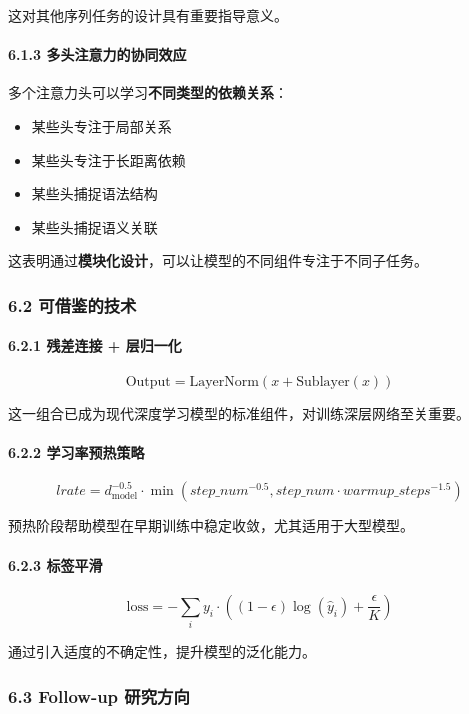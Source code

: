 \documentclass[11pt,a4paper]{article}
\begin{document}
这对其他序列任务的设计具有重要指导意义。

\paragraph{6.1.3 多头注意力的协同效应}

多个注意力头可以学习\textbf{不同类型的依赖关系}：
\begin{itemize}
  \item 某些头专注于局部关系
  \item 某些头专注于长距离依赖
  \item 某些头捕捉语法结构
  \item 某些头捕捉语义关联
\end{itemize}

这表明通过\textbf{模块化设计}，可以让模型的不同组件专注于不同子任务。

\subsubsection*{6.2 可借鉴的技术}

\paragraph{6.2.1 残差连接 + 层归一化}

\[
\text{Output} = \text{LayerNorm}(x + \text{Sublayer}(x))
\]

这一组合已成为现代深度学习模型的标准组件，对训练深层网络至关重要。

\paragraph{6.2.2 学习率预热策略}

\[
lrate = d_{\text{model}}^{-0.5} \cdot \min\left(step\_num^{-0.5}, step\_num \cdot warmup\_steps^{-1.5}\right)
\]

预热阶段帮助模型在早期训练中稳定收敛，尤其适用于大型模型。

\paragraph{6.2.3 标签平滑}

\[
\text{loss} = -\sum_{i} y_i \cdot \left((1 - \epsilon)\log(\hat{y}_i) + \frac{\epsilon}{K}\right)
\]

通过引入适度的不确定性，提升模型的泛化能力。

\subsubsection*{6.3 Follow-up 研究方向}
\end{document}
